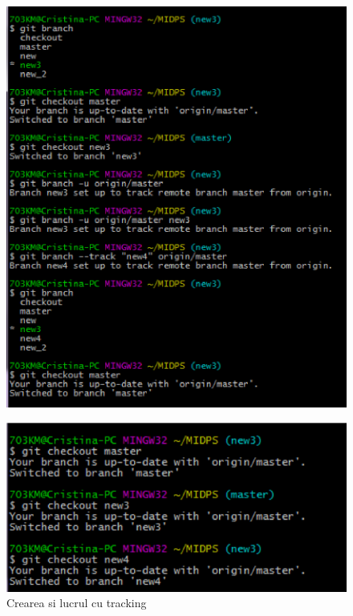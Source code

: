 \documentclass[11pt]{article}
\begin{document}
\begin{figure}[h]
\includegraphics{images/17.eps}
\end{figure}

\begin{figure}[h]
\includegraphics{images/18.eps}
\caption{Crearea si lucrul cu tracking}
\end{figure}
\end{document}
